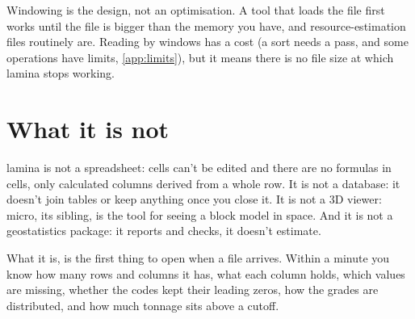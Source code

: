 \begin{why}
Windowing is the design, not an optimisation. A tool that loads the file first works until the file is
bigger than the memory you have, and resource-estimation files routinely are. Reading by windows has a
cost (a sort needs a pass, and some operations have limits, \cref{app:limits}), but it means there is no
file size at which lamina stops working.
\end{why}

\section{What it is not}

lamina is not a spreadsheet: cells can't be edited and there are no formulas in cells, only calculated
columns derived from a whole row. It is not a database: it doesn't join tables or keep anything once you
close it. It is not a 3D viewer: micro, its sibling, is the tool for seeing a block model in space. And it is not a geostatistics package: it reports and
checks, it doesn't estimate.

What it is, is the first thing to open when a file arrives. Within a minute you know how many rows and
columns it has, what each column holds, which values are missing, whether the codes kept their leading
zeros, how the grades are distributed, and how much tonnage sits above a cutoff.
